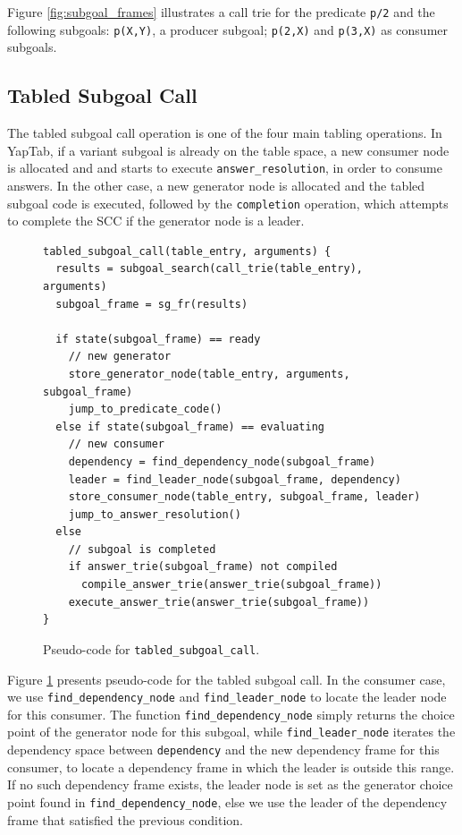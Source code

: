 Figure \ref{fig:subgoal_frames} illustrates a call trie for the predicate \texttt{p/2}
and the following subgoals: \texttt{p(X,Y)}, a producer subgoal; \texttt{p(2,X)} and
\texttt{p(3,X)} as consumer subgoals. 

\subsection{Tabled Subgoal Call}

The tabled subgoal call operation is one of the four main tabling operations. In YapTab,
if a variant subgoal is already on the table space, a new consumer node is allocated and
and starts to execute \texttt{answer\_resolution}, in order to consume answers. In
the other case, a new generator node is allocated and the tabled subgoal code is executed,
followed by the \texttt{completion} operation, which attempts to complete the SCC if the
generator node is a leader.

\begin{figure}[ht]
\begin{Verbatim}
tabled_subgoal_call(table_entry, arguments) {
  results = subgoal_search(call_trie(table_entry), arguments)
  subgoal_frame = sg_fr(results)
  
  if state(subgoal_frame) == ready
    // new generator
    store_generator_node(table_entry, arguments, subgoal_frame)
    jump_to_predicate_code()
  else if state(subgoal_frame) == evaluating
    // new consumer
    dependency = find_dependency_node(subgoal_frame)
    leader = find_leader_node(subgoal_frame, dependency)
    store_consumer_node(table_entry, subgoal_frame, leader)
    jump_to_answer_resolution()
  else
    // subgoal is completed
    if answer_trie(subgoal_frame) not compiled
      compile_answer_trie(answer_trie(subgoal_frame))
    execute_answer_trie(answer_trie(subgoal_frame))
}
\end{Verbatim}
\caption{Pseudo-code for \texttt{tabled\_subgoal\_call}.}
\label{fig:tabled_subgoal_call}
\end{figure}

Figure \ref{fig:tabled_subgoal_call} presents pseudo-code for the tabled subgoal call.
In the consumer case, we use \texttt{find\_dependency\_node} and \texttt{find\_leader\_node}
to locate the leader node for this consumer. The function \texttt{find\_dependency\_node} simply
returns the choice point of the generator node for this subgoal, while \texttt{find\_leader\_node}
iterates the dependency space between \texttt{dependency} and the new dependency frame for this consumer,
to locate a dependency frame in which the leader is outside this range. If no such dependency frame
exists, the leader node is set as the generator choice point found in \texttt{find\_dependency\_node},
else we use the leader of the dependency frame that satisfied the previous condition. 

